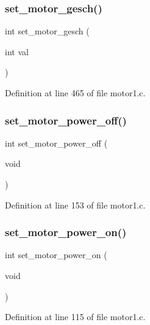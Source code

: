 \mbox{\label{_motor1_8h_a3e09d5cea7b692aceb221749999cb52b}} 
\subsubsection{set\+\_\+motor\+\_\+gesch()}
{\footnotesize\ttfamily int set\+\_\+motor\+\_\+gesch (\begin{DoxyParamCaption}\item[{int}]{val }\end{DoxyParamCaption})}



Definition at line 465 of file motor1.\+c.

\mbox{\label{_motor1_8h_aca930076cffa70b62efe0f7f4281f80d}} 
\subsubsection{set\+\_\+motor\+\_\+power\+\_\+off()}
{\footnotesize\ttfamily int set\+\_\+motor\+\_\+power\+\_\+off (\begin{DoxyParamCaption}\item[{void}]{ }\end{DoxyParamCaption})}



Definition at line 153 of file motor1.\+c.

\mbox{\label{_motor1_8h_a880850784362150376faf21b3ce817ca}} 
\subsubsection{set\+\_\+motor\+\_\+power\+\_\+on()}
{\footnotesize\ttfamily int set\+\_\+motor\+\_\+power\+\_\+on (\begin{DoxyParamCaption}\item[{void}]{ }\end{DoxyParamCaption})}



Definition at line 115 of file motor1.\+c.

